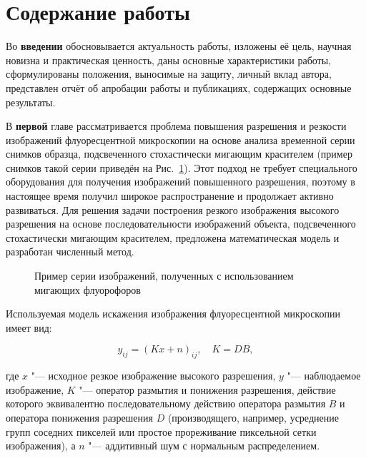 \section*{Содержание работы}

Во {\textbf{введении}} обосновывается актуальность работы, изложены её цель, научная новизна и практическая ценность, даны основные характеристики работы, сформулированы положения, выносимые на защиту, личный вклад автора, представлен отчёт об апробации работы и публикациях, содержащих основные результаты.


В {\textbf{первой}} главе рассматривается проблема повышения разрешения и резкости изображений флуоресцентной микроскопии на основе анализа временной серии снимков образца, подсвеченного стохастически мигающим красителем (пример снимков такой серии приведён на Рис.~\ref{fig:sinopsis-blinking-samples}). Этот подход не требует специального оборудования для получения изображений повышенного разрешения, поэтому в настоящее время получил широкое распространение и продолжает активно развиваться. Для решения задачи построения резкого изображения высокого разрешения на основе последовательности изображений объекта, подсвеченного стохастически мигающим красителем, предложена математическая модель и разработан численный метод.

\begin{figure}[ht]
	\caption{Пример серии изображений, полученных с использованием мигающих флуорофоров}
	\label{fig:sinopsis-blinking-samples}
\end{figure}

Используемая модель искажения изображения флуоресцентной микроскопии имеет вид:

\begin{equation*}
	y_{ij} = \left(Kx+n\right)_{ij},\quad K=DB,
\end{equation*}

\noindent где $x$ "--- исходное резкое изображение высокого разрешения, $y$ "--- наблюдаемое изображение, $K$ "--- оператор размытия и понижения разрешения, действие которого эквивалентно последовательному действию оператора размытия $B$ и оператора понижения разрешения $D$ (производящего, например, усреднение групп соседних пикселей или простое прореживание пиксельной сетки изображения), а $n$ "--- аддитивный шум с нормальным распределением.

